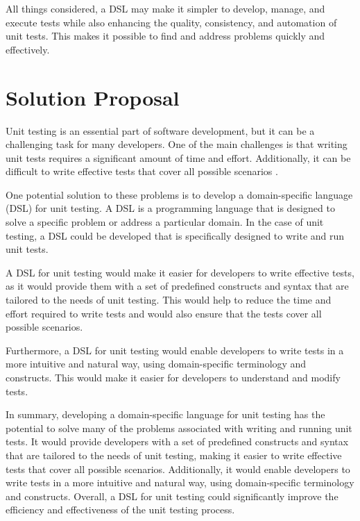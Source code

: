 All things considered, a DSL may make it simpler to develop, manage, and execute tests while also enhancing the quality, consistency, and automation of unit tests. This makes it possible to find and address problems quickly and effectively.




\section{Solution Proposal}

Unit testing is an essential part of software development, but it can be a challenging task for many developers. One of the main challenges is that writing unit tests requires a significant amount of time and effort. Additionally, it can be difficult to write effective tests that cover all possible scenarios \cite{guru99}.  

One potential solution to these problems is to develop a domain-specific language (DSL) for unit testing. A DSL is a programming language that is designed to solve a specific problem or address a particular domain. In the case of unit testing, a DSL could be developed that is specifically designed to write and run unit tests.

A DSL for unit testing would make it easier for developers to write effective tests, as it would provide them with a set of predefined constructs and syntax that are tailored to the needs of unit testing. This would help to reduce the time and effort required to write tests and would also ensure that the tests cover all possible scenarios.

Furthermore, a DSL for unit testing would enable developers to write tests in a more intuitive and natural way, using domain-specific terminology and constructs. This would make it easier for developers to understand and modify tests.

In summary, developing a domain-specific language for unit testing has the potential to solve many of the problems associated with writing and running unit tests. It would provide developers with a set of predefined constructs and syntax that are tailored to the needs of unit testing, making it easier to write effective tests that cover all possible scenarios. Additionally, it would enable developers to write tests in a more intuitive and natural way, using domain-specific terminology and constructs. Overall, a DSL for unit testing could significantly improve the efficiency and effectiveness of the unit testing process.

